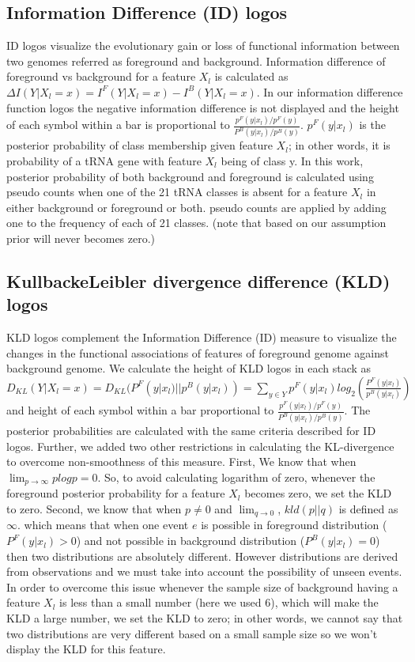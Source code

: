 \documentclass[table,
12pt, %
a4paper, %
oneside, %
headinclude,footinclude, %
BCOR5mm, %
]{scrartcl}
\begin{document}
\subsection{Information Difference (ID) logos}  
ID logos \cite{FREYHULT20071276} visualize the evolutionary gain or loss of functional information between two genomes referred as foreground and background. Information difference of foreground vs background for a feature $X_l$ is calculated as $\Delta I(Y|X_l=x)=I^F(Y|X_l=x)-I^B(Y|X_l=x)$. In our information difference function logos the negative information difference is not displayed and the height of each symbol within a bar is proportional to $\frac{p^F(y|x_l)/p^F(y)}{P^B(y|x_l)/p^B(y)}$. $p^F(y|x_l)$ is the posterior probability of class membership given feature $X_l$; in other words, it is probability of a tRNA gene with feature $X_l$ being of class y. In this work, posterior probability of both background and foreground is calculated using pseudo counts when one of the 21 tRNA classes is absent for a feature $X_l$ in either background or foreground or both. pseudo counts are applied by adding one to the frequency of each of 21 classes. (note that based on our assumption prior will never becomes zero.)\\
\subsection{KullbackeLeibler divergence difference (KLD) logos}
KLD logos \cite{FREYHULT20071276} complement the Information Difference (ID) measure to visualize the changes in the functional associations of features of foreground genome against background genome. We calculate the height of KLD logos in each stack as $D_{KL}(Y|X_l=x)=D_{KL}(P^F(y|x_l)||p^B(y|x_l))= \sum_{y \in Y} p^F(y|x_l)log_2(\frac{P^F(y|x_l)}{p^B(y|x_l)})$ and height of each symbol within a bar proportional to $\frac{p^F(y|x_l)/p^F(y)}{P^B(y|x_l)/p^B(y)}$. The posterior probabilities are calculated with the same criteria described for ID logos. Further, we added two other restrictions in calculating the KL-divergence to overcome non-smoothness of this measure. First, We know that when $\lim_{p \to \infty}{p log p} = 0$. So, to avoid calculating logarithm of zero, whenever the foreground posterior probability for a feature $X_l$ becomes zero, we set the KLD to zero. Second, we know that when $p \neq 0$ and $\lim_{q \to 0}$, $kld(p||q)$ is defined as $\infty$. which means that when one event $e$ is possible in foreground distribution ($P^F(y|x_l) > 0$) and not possible in background distribution ($P^B(y|x_l) = 0$) then two distributions are absolutely different. However distributions are derived from observations and we must take into account the possibility of unseen events. In order to overcome this issue whenever the sample size of background having a feature $X_l$ is less than a small number (here we used 6), which will make the KLD a large number, we set the KLD to zero; in other words, we cannot say that two distributions are very different based on a small sample size so we won't display the KLD for this feature.\\
        
\renewcommand{\refname}{\spacedlowsmallcaps{References}} %

\end{document}
